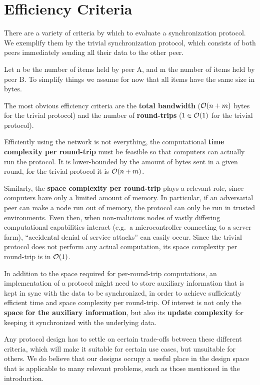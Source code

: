 \section{Efficiency Criteria}\label{efficiency-criteria}

There are a variety of criteria by which to evaluate a synchronization
protocol. We exemplify them by the trivial synchronization protocol,
which consists of both peers immediately sending all their data to the
other peer.

Let n be the number of items held by peer A, and m the number of items
held by peer B. To simplify things we assume for now that all items have
the same size in bytes.

The most obvious efficiency criteria are the \textbf{total bandwidth}
($\mathcal{O}(n + m)$ bytes for the trivial protocol) and the number of
\textbf{round-trips} ($1 \in \mathcal{O}(1)$ for the trivial protocol).

Efficiently using the network is not everything, the computational
\textbf{time complexity per round-trip} must be feasible so that
computers can actually run the protocol. It is lower-bounded by the
amount of bytes sent in a given round, for the trivial protocol it is
$\mathcal{O}(n + m)$.

Similarly, the \textbf{space complexity per round-trip} plays a relevant
role, since computers have only a limited amount of memory. In
particular, if an adversarial peer can make a node run out of memory,
the protocol can only be run in trusted environments. Even then, when
non-malicious nodes of vastly differing computational capabilities
interact (e.g.~a microcontroller connecting to a server farm),
``accidental denial of service attacks'' can easily occur. Since the
trivial protocol does not perform any actual computation, its space
complexity per round-trip is in $\mathcal{O}(1)$.

In addition to the space required for per-round-trip computations, an
implementation of a protocol might need to store auxiliary information
that is kept in sync with the data to be synchronized, in order to
achieve sufficiently efficient time and space complexity per round-trip.
Of interest is not only the \textbf{space for the auxiliary
information}, but also its \textbf{update complexity} for keeping it
synchronized with the underlying data.

Any protocol design has to settle on certain trade-offs between these
different criteria, which will make it suitable for certain use cases,
but unsuitable for others. We do believe that our designs occupy a
useful place in the design space that is applicable to many relevant
problems, such as those mentioned in the introduction.


